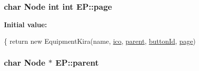 \subsubsection[{\texorpdfstring{page}{page}}]{\setlength{\rightskip}{0pt plus 5cm}char {\bf Node} int int E\+P\+::page}\hypertarget{namespace_e_p_adb4f80317eaf1286f16eedd566da82ba}{}\label{namespace_e_p_adb4f80317eaf1286f16eedd566da82ba}
{\bfseries Initial value\+:}
\begin{DoxyCode}
\{
        \textcolor{keywordflow}{return} \textcolor{keyword}{new} EquipmentKira(name, \hyperlink{namespace_e_p_a9bb18717237cbb94269e26c77cc04b05}{ico}, \hyperlink{namespace_e_p_ae54856cdea91964313d781ec414f88fc}{parent}, \hyperlink{namespace_e_p_af35e4c78a6ab0ddc628032ea5894199a}{buttonId}, 
      \hyperlink{namespace_e_p_adb4f80317eaf1286f16eedd566da82ba}{page})
\end{DoxyCode}
\subsubsection[{\texorpdfstring{parent}{parent}}]{\setlength{\rightskip}{0pt plus 5cm}char {\bf Node} $\ast$ E\+P\+::parent}\hypertarget{namespace_e_p_ae54856cdea91964313d781ec414f88fc}{}\label{namespace_e_p_ae54856cdea91964313d781ec414f88fc}
